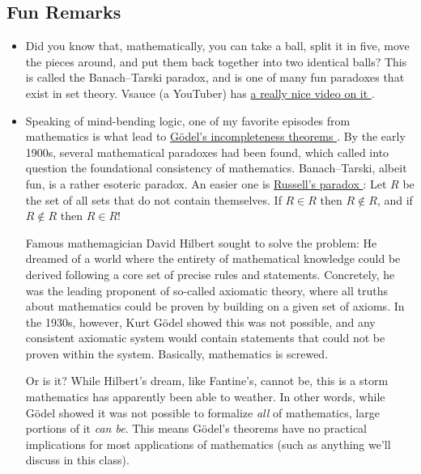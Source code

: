 \documentclass{article}
\begin{document}
\subsection{Fun Remarks}
\label{sub:fun_remarks}

\begin{itemize}[label=$\bullet$]
  \item Did you know that, mathematically, you can take a ball, split it in five, move the pieces around, and put them back together into two identical balls? This is called the Banach–Tarski paradox, and is one of many fun paradoxes that exist in set theory. Vsauce (a YouTuber) has \href{https://www.youtube.com/watch?v=s86-Z-CbaHA}{ a really nice video on it \ExternalLink}.

  \item Speaking of mind-bending logic, one of my favorite episodes from mathematics is what lead to \href{https://en.wikipedia.org/wiki/G%C3%B6del%27s_incompleteness_theorems}{Gödel's incompleteness theorems \ExternalLink}. By the early 1900s, several mathematical paradoxes had been found, which called into question the foundational consistency of mathematics. Banach–Tarski, albeit fun, is a rather esoteric paradox. An easier one is \href{https://en.wikipedia.org/wiki/Russell%27s_paradox}{Russell's paradox \ExternalLink}: Let $R$ be the set of all sets that do not contain themselves. If $R \in R$ then $R \notin R$, and if $R \notin R$ then $R \in R$!

    Famous mathemagician David Hilbert sought to solve the problem: He dreamed of a world where the entirety of mathematical knowledge could be derived following a core set of precise rules and statements. Concretely, he was the leading proponent of so-called axiomatic theory, where all truths about mathematics could be proven by building on a given set of axioms. In the 1930s, however, Kurt Gödel showed this was not possible, and any consistent axiomatic system would contain statements that could not be proven within the system. Basically, mathematics is screwed.

    Or is it? While Hilbert's dream, like Fantine's, cannot be, this is a storm mathematics has apparently been able to weather. In other words, while Gödel showed it was not possible to formalize \textit{all} of mathematics, large portions of it \textit{can be}. This means Gödel's theorems have no practical implications for most applications of mathematics (such as anything we'll discuss in this class).


\end{itemize}
\end{document}
